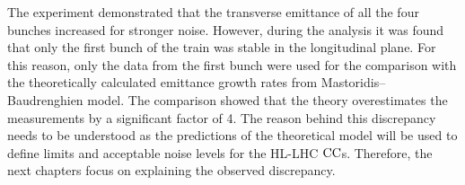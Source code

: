 The experiment demonstrated that the transverse emittance of all the four bunches increased for stronger noise. However, during the analysis it was found that only the first bunch of the train was stable in the longitudinal plane. For this reason, only the data from the first bunch were used for the comparison with the theoretically calculated emittance growth rates from Mastoridis--Baudrenghien model. The comparison showed that the theory overestimates the measurements by a significant factor of 4. The reason behind this discrepancy needs to be understood as the predictions of the theoretical model will be used to define limits and acceptable noise levels for the HL-LHC ${\mathrm{CC}}$s. Therefore, the next chapters focus on explaining the observed discrepancy.
